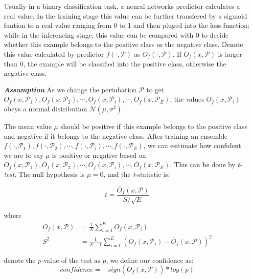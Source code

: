 \documentclass{article}
\begin{document}
Usually in a binary classification task, a neural networks predictor calculates a real value. In the training stage this value can be further transfered by a sigmoid funtion to a real value ranging from 0 to 1 and then pluged into the loss function; while in the inferencing stage, this value can be compared with 0 to decide whether this example belongs to the positive class or the negative class. Denote this value calculated by predictor $f \left(\cdot , \mathcal{P}\right)$ as $O_f \left(\cdot , \mathcal{P}\right)$. If $O_f \left(x , \mathcal{P}\right)$ is larger than 0, the example will be classified into the positive class, otherwise the negative class.

\textit{\textbf{Assumption}} As we change the pertubation $\mathcal{P}$ to get $O_f \left(x , \mathcal{P}_1\right), O_f \left(x , \mathcal{P}_2\right),\cdots, O_f \left(x , \mathcal{P}_i\right),\cdots,O_f \left(x , \mathcal{P}_E\right) $, the values $O_f \left(x , \mathcal{P}_i\right)$ obeys a normal distribution $\mathcal{N}(\mu,{\sigma}^2)$. 

The mean value $\mu$ should be positive if this example belongs to the positive class and negative if it belongs to the negative class. After training an ensemble $f \left(\cdot , \mathcal{P}_1\right), f \left(\cdot , \mathcal{P}_2\right),\cdots, f \left(\cdot , \mathcal{P}_i\right),\cdots,f \left(\cdot , \mathcal{P}_E\right) $, we can esitimate how confident we are to say $\mu$ is positive or negative based on $O_f \left(x , \mathcal{P}_1\right), O_f \left(x , \mathcal{P}_2\right),\cdots, O_f \left(x , \mathcal{P}_i\right),\cdots,O_f \left(x , \mathcal{P}_E\right) $. This can be done by \textit{t-test}. The null hypothesis is $\mu = 0$, and the \textit{t}-statistic is: 

\begin{equation}
    t = \frac{\overline{O}_f\left(x , \mathcal{P}\right)}{S/\sqrt{E}}
\end{equation}

where
    \begin{eqnarray}
            \overline{O}_f\left(x , \mathcal{P}\right) &= \frac{1}{E} \sum_{i=1}^E O_f\left(x , \mathcal{P}_i\right) \\
            S^2 &= \frac{1}{E-1} \sum_{i=1}^E {(O_f\left(x , \mathcal{P}_i\right) - \overline{O}_f\left(x , \mathcal{P}\right))}^2
    \end{eqnarray}

denote the $\textit{p}$-value of the test as $\textit{p}$, we define our confidence as:
\begin{equation}
    confidence = -sign( \overline{O}_f\left(x , \mathcal{P}\right))*log(\textit{p})
\end{equation}
\end{document}
